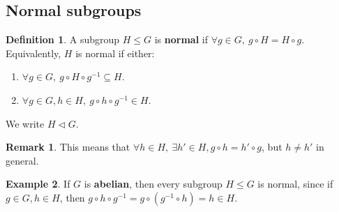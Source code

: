 \documentclass[12pt,a4paper]{article}
\theoremstyle{definition}
\newtheorem{definition}{Definition}[subsection]
\newtheorem{example}[definition]{Example}
\newtheorem*{remark}{Remark}
\begin{document}
\subsection{Normal subgroups}

\begin{definition}
	A subgroup $H \le G$ is \textbf{normal} if $\forall g \in G, \ g \circ H = H \circ g$. Equivalently, $H$ is normal if either:
	\begin{enumerate}
		\item $\forall g \in G, \ g \circ H \circ g^{-1} \subseteq H$.
		\item $\forall g \in G, h \in H, \ g \circ h \circ g^{-1} \in H$.
	\end{enumerate}
	We write $H \triangleleft G$.
\end{definition}

\begin{remark}
	This means that $\forall h \in H, \ \exists h' \in H, g \circ h = h' \circ g$, but $h \ne h'$ in general.
\end{remark}

\begin{example}
	If $G$ is \textbf{abelian}, then every subgroup $H \le G$ is normal, since if $g \in G, h \in H$, then $g \circ h \circ g^{-1} = g \circ (g^{-1} \circ h) = h \in H$.
\end{example}
\end{document}
